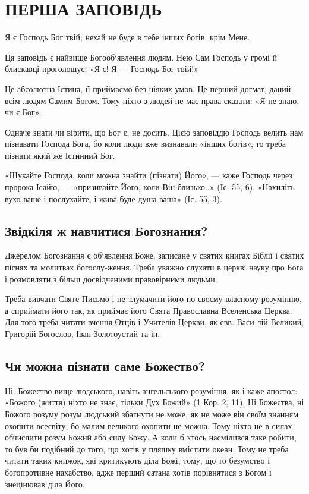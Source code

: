 \documentclass[main.tex]{subfiles}
\begin{document}
\section{ПЕРША ЗАПОВІДЬ}

Я є Господь Бог твій; нехай не буде в тебе інших богів, крім Мене.

Ця заповідь є найвище Богооб`явлення людям. Нею Сам Господь у громі й блискавці проголошує: «Я є! Я — Господь Бог твій!»

Це абсолютна Істина, її приймаємо без ніяких умов. Це перший догмат, даний всім людям Самим Богом. Тому ніхто з людей не має права сказати: «Я не знаю, чи є Бог».

Одначе знати чи вірити, що Бог є, не досить. Цією заповіддю Господь велить нам пізнавати Господа Бога, бо коли люди вже визнавали «інших богів», то треба пізнати який же Істинний Бог.

«Шукайте Господа, коли можна знайти (пізнати) Його», — каже Господь через пророка Ісайю, — «призивайте Його, коли Він близько..» (Іс. 55, 6). «Нахиліть вухо ваше і послухайте, і жива буде душа ваша» (Іс. 55, 3).

\subsection{Звідкіля ж навчитися Богознання?}

Джерелом Богознання є об`явлення Боже, записане у святих книгах Біблії і святих піснях та молитвах богослу-ження. Треба уважно слухати в церкві науку про Бога і розмовляти з більш досвідченими правовірними людьми.

Треба вивчати Святе Письмо і не тлумачити його по своєму власному розумінню, а сприймати його так, як приймає його Свята Православна Вселенська Церква. Для того треба читати вчення Отців і Учителів Церкви, як свв. Васи-лій Великий, Григорій Богослов, Іван Золотоустий та ін.

\subsection{Чи можна пізнати саме Божество?}

Ні. Божество вище людського, навіть ангельського розуміння, як і каже апостол: «Божого (життя) ніхто не знає, тільки Дух Божий» (1 Кор. 2, 11). Ні Божества, ні Божого розуму розум людський збагнути не може, як не може він своїм знанням охопити всесвіту, бо малим великого охопити не можна. Тому ніхто не в силах обчислити розум Божий або силу Божу. А коли б хтось насмілився таке робити, то був би подібний до того, що хотів у пляшку вмістити океан. Тому не треба читати таких книжок, які критикують діла Божі, тому, що то безумство і богопротивне нахабство, адже перший сатана хотів порівнятися з Богом і знецінював діла Його.
\end{document}
